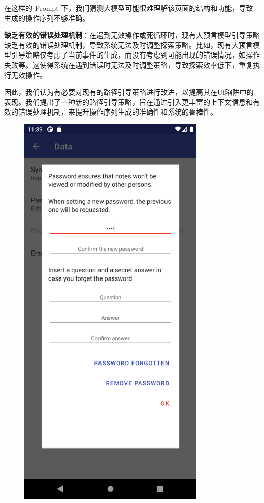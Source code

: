 \documentclass{article}
\begin{document}
在这样的 Prompt 下，我们猜测大模型可能很难理解该页面的结构和功能，导致生成的操作序列不够准确。

\textbf{缺乏有效的错误处理机制}：在遇到无效操作或死循环时，现有大预言模型引导策略缺乏有效的错误处理机制，导致系统无法及时调整探索策略。比如，现有大预言模型引导策略仅考虑了当前事件的生成，而没有考虑到可能出现的错误情况，如操作失败等。这使得系统在遇到错误时无法及时调整策略，导致探索效率低下，重复执行无效操作。

因此，我们认为有必要对现有的路径引导策略进行改进，以提高其在UI陷阱中的表现。我们提出了一种新的路径引导策略，旨在通过引入更丰富的上下文信息和有效的错误处理机制，来提升操作序列生成的准确性和系统的鲁棒性。

\begin{figure}[h]
    \begin{minipage}
        [t]{0.4\textwidth}
            \centering
            \includegraphics[width=0.8\textwidth]{1.png}

\end{minipage}
\end{figure}
\end{document}
